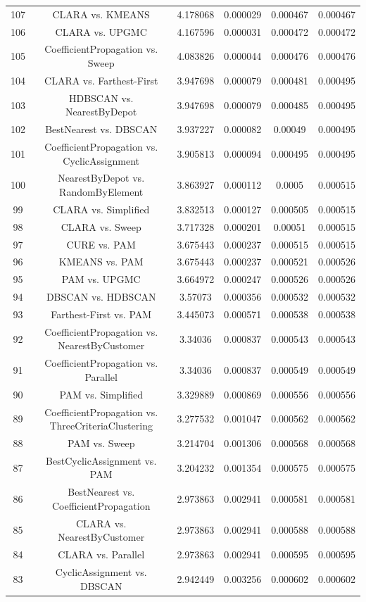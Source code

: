 \documentclass[a4paper,10pt]{article}
\begin{document}
\begin{landscape}
\begin{table}[!htp]
\begin{tabular}{cccccc}
107&CLARA vs. KMEANS&4.178068&0.000029&0.000467&0.000467\\
106&CLARA vs. UPGMC&4.167596&0.000031&0.000472&0.000472\\
105&CoefficientPropagation vs. Sweep&4.083826&0.000044&0.000476&0.000476\\
104&CLARA vs. Farthest-First&3.947698&0.000079&0.000481&0.000495\\
103&HDBSCAN vs. NearestByDepot&3.947698&0.000079&0.000485&0.000495\\
102&BestNearest vs. DBSCAN&3.937227&0.000082&0.00049&0.000495\\
101&CoefficientPropagation vs. CyclicAssignment&3.905813&0.000094&0.000495&0.000495\\
100&NearestByDepot vs. RandomByElement&3.863927&0.000112&0.0005&0.000515\\
99&CLARA vs. Simplified&3.832513&0.000127&0.000505&0.000515\\
98&CLARA vs. Sweep&3.717328&0.000201&0.00051&0.000515\\
97&CURE vs. PAM&3.675443&0.000237&0.000515&0.000515\\
96&KMEANS vs. PAM&3.675443&0.000237&0.000521&0.000526\\
95&PAM vs. UPGMC&3.664972&0.000247&0.000526&0.000526\\
94&DBSCAN vs. HDBSCAN&3.57073&0.000356&0.000532&0.000532\\
93&Farthest-First vs. PAM&3.445073&0.000571&0.000538&0.000538\\
92&CoefficientPropagation vs. NearestByCustomer&3.34036&0.000837&0.000543&0.000543\\
91&CoefficientPropagation vs. Parallel&3.34036&0.000837&0.000549&0.000549\\
90&PAM vs. Simplified&3.329889&0.000869&0.000556&0.000556\\
89&CoefficientPropagation vs. ThreeCriteriaClustering&3.277532&0.001047&0.000562&0.000562\\
88&PAM vs. Sweep&3.214704&0.001306&0.000568&0.000568\\
87&BestCyclicAssignment vs. PAM&3.204232&0.001354&0.000575&0.000575\\
86&BestNearest vs. CoefficientPropagation&2.973863&0.002941&0.000581&0.000581\\
85&CLARA vs. NearestByCustomer&2.973863&0.002941&0.000588&0.000588\\
84&CLARA vs. Parallel&2.973863&0.002941&0.000595&0.000595\\
83&CyclicAssignment vs. DBSCAN&2.942449&0.003256&0.000602&0.000602\\

\end{tabular}
\end{table}
\end{landscape}
\end{document}
